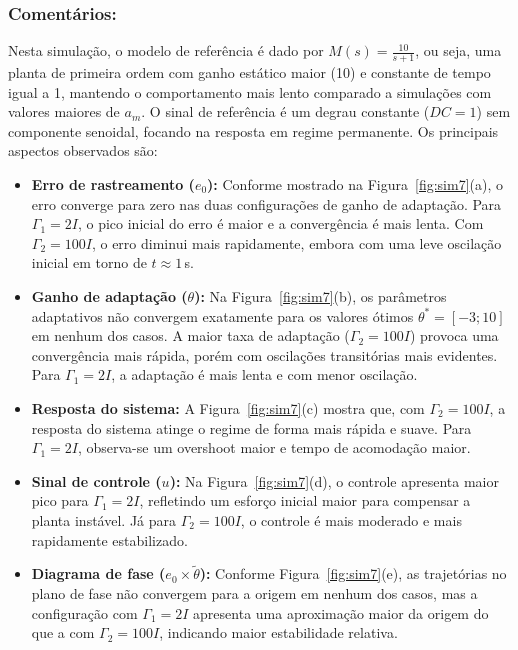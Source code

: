 \documentclass[10pt]{article}
\begin{document}
\subsubsection{Comentários:}

Nesta simulação, o modelo de referência é dado por $M(s) = \frac{10}{s+1}$, ou seja, uma planta de primeira ordem com ganho estático maior (10) e constante de tempo igual a 1, mantendo o comportamento mais lento comparado a simulações com valores maiores de $a_m$. O sinal de referência é um degrau constante ($DC=1$) sem componente senoidal, focando na resposta em regime permanente. Os principais aspectos observados são:

\begin{itemize}
    \item \textbf{Erro de rastreamento ($e_0$):} Conforme mostrado na Figura~\ref{fig:sim7}(a), o erro converge para zero nas duas configurações de ganho de adaptação. Para $\Gamma_1 = 2I$, o pico inicial do erro é maior e a convergência é mais lenta. Com $\Gamma_2 = 100I$, o erro diminui mais rapidamente, embora com uma leve oscilação inicial em torno de $t \approx 1$\,s.

    \item \textbf{Ganho de adaptação ($\theta$):} Na Figura~\ref{fig:sim7}(b), os parâmetros adaptativos não convergem exatamente para os valores ótimos $\theta^* = [-3; 10]$ em nenhum dos casos. A maior taxa de adaptação ($\Gamma_2 = 100I$) provoca uma convergência mais rápida, porém com oscilações transitórias mais evidentes. Para $\Gamma_1 = 2I$, a adaptação é mais lenta e com menor oscilação.

    \item \textbf{Resposta do sistema:} A Figura~\ref{fig:sim7}(c) mostra que, com $\Gamma_2 = 100I$, a resposta do sistema atinge o regime de forma mais rápida e suave. Para $\Gamma_1 = 2I$, observa-se um overshoot maior e tempo de acomodação maior.

    \item \textbf{Sinal de controle ($u$):} Na Figura~\ref{fig:sim7}(d), o controle apresenta maior pico para $\Gamma_1 = 2I$, refletindo um esforço inicial maior para compensar a planta instável. Já para $\Gamma_2 = 100I$, o controle é mais moderado e mais rapidamente estabilizado.

    \item \textbf{Diagrama de fase ($e_0 \times \tilde{\theta}$):} Conforme Figura~\ref{fig:sim7}(e), as trajetórias no plano de fase não convergem para a origem em nenhum dos casos, mas a configuração com $\Gamma_1 = 2I$ apresenta uma aproximação maior da origem do que a com $\Gamma_2 = 100I$, indicando maior estabilidade relativa.

\end{itemize}
\end{document}
